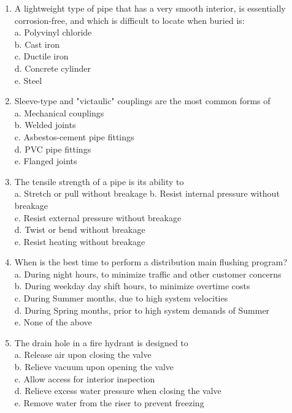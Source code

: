 \begin{enumerate}[1.]
\item A lightweight type of pipe that has a very smooth interior, is essentially corrosion-free, and which is difficult to locate when buried is:\\
a. Polyvinyl chloride\\
b. Cast iron\\
c. Ductile iron\\
d. Concrete cylinder\\
e. Steel

\item Sleeve-type and "victaulic" couplings are the most common forms of\\
a. Mechanical couplings\\
b. Welded joints\\
c. Asbestos-cement pipe fittings\\
d. PVC pipe fittings\\
e. Flanged joints\\

\item The tensile strength of a pipe is its ability to\\
a. Stretch or pull without breakage
b. Resist internal pressure without breakage\\
c. Resist external pressure without breakage\\
d. Twist or bend without breakage\\
e. Resist heating without breakage\\

\item When is the best time to perform a distribution main flushing program?\\
a. During night hours, to minimize traffic and other customer concerns\\
b. During weekday day shift hours, to minimize overtime costs\\
c. During Summer months, due to high system velocities\\
d. During Spring months, prior to high system demands of Summer\\
e. None of the above\\

\item The drain hole in a fire hydrant is designed to\\
a. Release air upon closing the valve\\
b. Relieve vacuum upon opening the valve\\
c. Allow access for interior inspection\\
d. Relieve excess water pressure when closing the valve\\
e. Remove water from the riser to prevent freezing\\


\end{enumerate}
